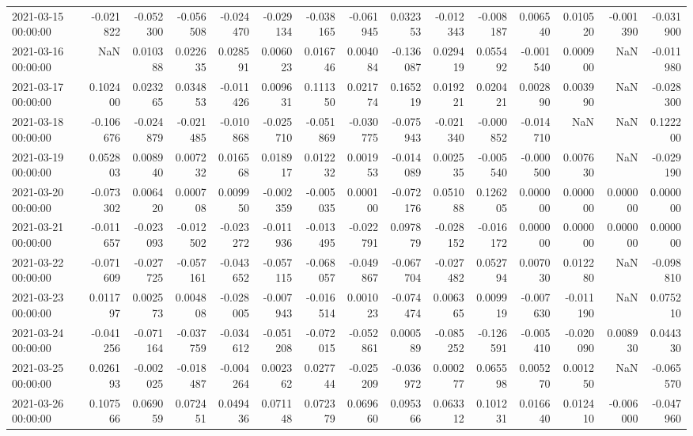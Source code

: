 \begin{tabular}{lrrrrrrrrrrrrrr}
2021-03-15 00:00:00 & -0.021822 & -0.052300 & -0.056508 & -0.024470 & -0.029134 & -0.038165 & -0.061945 & 0.032353 & -0.012343 & -0.008187 & 0.006540 & 0.010520 & -0.001390 & -0.031900 \\
2021-03-16 00:00:00 & NaN & 0.010388 & 0.022635 & 0.028591 & 0.006023 & 0.016746 & 0.004084 & -0.136087 & 0.029419 & 0.055492 & -0.001540 & 0.000900 & NaN & -0.011980 \\
2021-03-17 00:00:00 & 0.102400 & 0.023265 & 0.034853 & -0.011426 & 0.009631 & 0.111350 & 0.021774 & 0.165219 & 0.019221 & 0.020421 & 0.002890 & 0.003990 & NaN & -0.028300 \\
2021-03-18 00:00:00 & -0.106676 & -0.024879 & -0.021485 & -0.010868 & -0.025710 & -0.051869 & -0.030775 & -0.075943 & -0.021340 & -0.000852 & -0.014710 & NaN & NaN & 0.122200 \\
2021-03-19 00:00:00 & 0.052803 & 0.008940 & 0.007232 & 0.016568 & 0.018917 & 0.012232 & 0.001953 & -0.014089 & 0.002535 & -0.005540 & -0.000500 & 0.007630 & NaN & -0.029190 \\
2021-03-20 00:00:00 & -0.073302 & 0.006420 & 0.000708 & 0.009950 & -0.002359 & -0.005035 & 0.000100 & -0.072176 & 0.051088 & 0.126205 & 0.000000 & 0.000000 & 0.000000 & 0.000000 \\
2021-03-21 00:00:00 & -0.011657 & -0.023093 & -0.012502 & -0.023272 & -0.011936 & -0.013495 & -0.022791 & 0.097879 & -0.028152 & -0.016172 & 0.000000 & 0.000000 & 0.000000 & 0.000000 \\
2021-03-22 00:00:00 & -0.071609 & -0.027725 & -0.057161 & -0.043652 & -0.057115 & -0.068057 & -0.049867 & -0.067704 & -0.027482 & 0.052794 & 0.007030 & 0.012280 & NaN & -0.098810 \\
2021-03-23 00:00:00 & 0.011797 & 0.002573 & 0.004808 & -0.028005 & -0.007943 & -0.016514 & 0.001023 & -0.074474 & 0.006365 & 0.009919 & -0.007630 & -0.011190 & NaN & 0.075210 \\
2021-03-24 00:00:00 & -0.041256 & -0.071164 & -0.037759 & -0.034612 & -0.051208 & -0.072015 & -0.052861 & 0.000589 & -0.085252 & -0.126591 & -0.005410 & -0.020090 & 0.008930 & 0.044330 \\
2021-03-25 00:00:00 & 0.026193 & -0.002025 & -0.018487 & -0.004264 & 0.002362 & 0.027744 & -0.025209 & -0.036972 & 0.000277 & 0.065598 & 0.005270 & 0.001250 & NaN & -0.065570 \\
2021-03-26 00:00:00 & 0.107566 & 0.069059 & 0.072451 & 0.049436 & 0.071148 & 0.072379 & 0.069660 & 0.095366 & 0.063312 & 0.101231 & 0.016640 & 0.012410 & -0.006000 & -0.047960 \\

\end{tabular}
